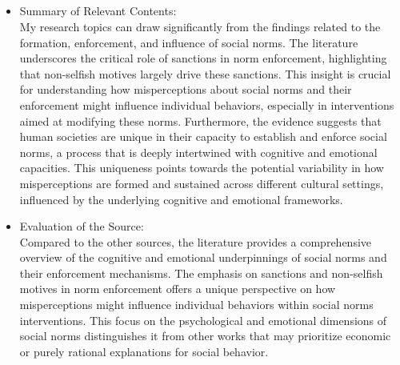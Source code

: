 \documentclass{article}
\begin{document}
\subsection{}
\begin{itemize}
    \item Summary of Relevant Contents:\\
My research topics can draw significantly from the findings related to the formation, enforcement, and influence of social norms. The literature underscores the critical role of sanctions in norm enforcement, highlighting that non-selfish motives largely drive these sanctions. This insight is crucial for understanding how misperceptions about social norms and their enforcement might influence individual behaviors, especially in interventions aimed at modifying these norms. Furthermore, the evidence suggests that human societies are unique in their capacity to establish and enforce social norms, a process that is deeply intertwined with cognitive and emotional capacities. This uniqueness points towards the potential variability in how misperceptions are formed and sustained across different cultural settings, influenced by the underlying cognitive and emotional frameworks.
\end{itemize}
\begin{itemize}
    \item Evaluation of the Source:\\
Compared to the other sources, the literature provides a comprehensive overview of the cognitive and emotional underpinnings of social norms and their enforcement mechanisms. The emphasis on sanctions and non-selfish motives in norm enforcement offers a unique perspective on how misperceptions might influence individual behaviors within social norms interventions. This focus on the psychological and emotional dimensions of social norms distinguishes it from other works that may prioritize economic or purely rational explanations for social behavior.
\end{itemize}
\end{document}
